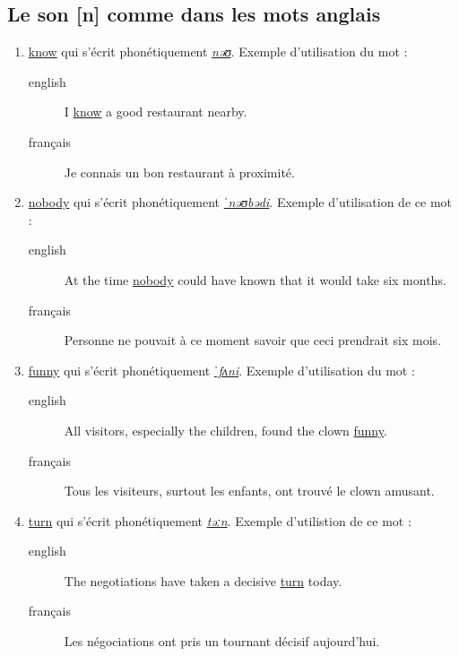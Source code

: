 \documentclass[12pt,a4paper]{book}
\begin{document}
\subsection{Le son [n] comme dans les mots anglais}
\label{sec:org1fe12d0}
\begin{enumerate}
\item \href{http://www.wordreference.com/enfr/know}{know} qui s'écrit phonétiquement \href{https://en.oxforddictionaries.com/definition/know}{\emph{nəʊ}}. Exemple d'utilisation du
mot : 
\begin{description}
\item[{english}] \textenglish{I \href{https://youtu.be/j-CwwdwQV54}{know} a good restaurant nearby.}
\item[{français}] Je connais un bon restaurant à proximité.
\end{description}
\item \href{http://www.wordreference.com/enfr/nobody}{nobody} qui s'écrit phonétiquement \href{https://en.oxforddictionaries.com/definition/nobody}{\emph{ˈnəʊbədi}}. Exemple d'utilisation
de ce mot :
\begin{description}
\item[{english}] \textenglish{At the time \href{https://youtu.be/icE0AqVSnzo}{nobody} could have known that it would take
six months.}
\item[{français}] Personne ne pouvait à ce moment savoir que ceci prendrait six mois.
\end{description}
\item \href{http://www.wordreference.com/enfr/funny}{funny} qui s'écrit phonétiquement \href{https://en.oxforddictionaries.com/definition/funny}{\emph{ˈfʌni}}. Exemple d'utilisation du
mot : 
\begin{description}
\item[{english}] \textenglish{All visitors, especially the children, found the clown
\href{https://youtu.be/CNXOu7gPEXM}{funny}.}
\item[{français}] Tous les visiteurs, surtout les enfants, ont trouvé
le clown amusant.
\end{description}
\item \href{http://www.wordreference.com/enfr/turn}{turn} qui s'écrit phonétiquement \href{https://en.oxforddictionaries.com/definition/turn}{\emph{təːn}}. Exemple d'utilistion de ce
mot : 
\begin{description}
\item[{english}] \textenglish{The negotiations have taken a decisive \href{https://youtu.be/z4g45vTgczE}{turn} today.}
\item[{français}] Les négociations ont pris un tournant décisif
aujourd'hui.
\end{description}
\end{enumerate}
\end{document}
